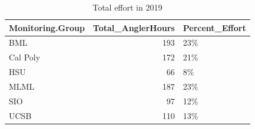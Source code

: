 \documentclass[
]{article}
\begin{document}
\begin{table}

\caption{\label{tab:effort2019}Total effort in 2019}
\centering
\begin{tabular}[t]{lrl}
\toprule
Monitoring.Group & Total\_AnglerHours & Percent\_Effort\\
\midrule
BML & 193 & 23\%\\
Cal Poly & 172 & 21\%\\
HSU & 66 & 8\%\\
MLML & 187 & 23\%\\
SIO & 97 & 12\%\\
\addlinespace
UCSB & 110 & 13\%\\
\bottomrule
\end{tabular}
\end{table}
\end{document}
